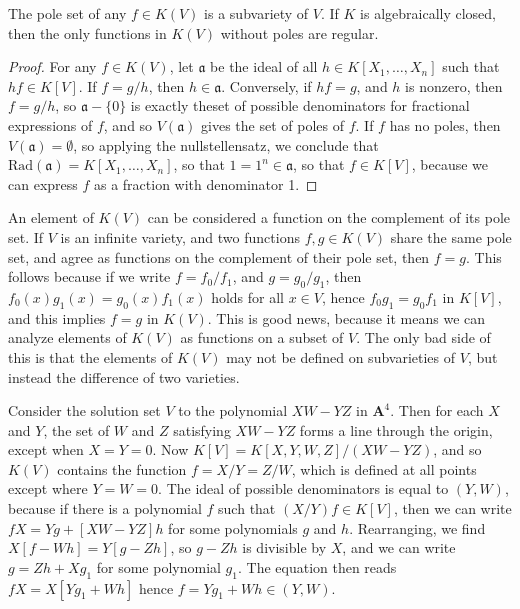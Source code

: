 \begin{prop}
    The pole set of any $f \in K(V)$ is a subvariety of $V$. If $K$ is algebraically closed, then the only functions in $K(V)$ without poles are regular.
\end{prop}
\begin{proof}
    For any $f \in K(V)$, let $\mathfrak{a}$ be the ideal of all $h \in K[X_1, \dots, X_n]$ such that $hf \in K[V]$. If $f = g/h$, then $h \in \mathfrak{a}$. Conversely, if $hf = g$, and $h$ is nonzero, then $f = g/h$, so $\mathfrak{a} - \{ 0 \}$ is exactly theset of possible denominators for fractional expressions of $f$, and so $V(\mathfrak{a})$ gives the set of poles of $f$. If $f$ has no poles, then $V(\mathfrak{a}) = \emptyset$, so applying the nullstellensatz, we conclude that $\text{Rad}(\mathfrak{a}) = K[X_1, \dots, X_n]$, so that $1 = 1^n \in \mathfrak{a}$, so that $f \in K[V]$, because we can express $f$ as a fraction with denominator 1.
\end{proof}

An element of $K(V)$ can be considered a function on the complement of its pole set. If $V$ is an infinite variety, and two functions $f,g \in K(V)$ share the same pole set, and agree as functions on the complement of their pole set, then $f = g$. This follows because if we write $f = f_0/f_1$, and $g = g_0/g_1$, then $f_0(x) g_1(x) = g_0(x) f_1(x)$ holds for all $x \in V$, hence $f_0g_1 = g_0f_1$ in $K[V]$, and this implies $f = g$ in $K(V)$. This is good news, because it means we can analyze elements of $K(V)$ as functions on a subset of $V$. The only bad side of this is that the elements of $K(V)$ may not be defined on subvarieties of $V$, but instead the difference of two varieties.

\begin{example}
    Consider the solution set $V$ to the polynomial $XW - YZ$ in $\mathbf{A}^4$. Then for each $X$ and $Y$, the set of $W$ and $Z$ satisfying $XW - YZ$ forms a line through the origin, except when $X = Y = 0$. Now $K[V] = K[X,Y,W,Z]/(XW - YZ)$, and so $K(V)$ contains the function $f = X/Y = Z/W$, which is defined at all points except where $Y = W = 0$. The ideal of possible denominators is equal to $(Y,W)$, because if there is a polynomial $f$ such that $(X/Y)f\in K[V]$, then we can write $fX = Yg + [XW - YZ]h$ for some polynomials $g$ and $h$. Rearranging, we find $X[f-Wh] = Y[g-Zh]$, so $g - Zh$ is divisible by $X$, and we can write $g = Zh + Xg_1$ for some polynomial $g_1$. The equation then reads $fX = X[Yg_1 + Wh]$ hence $f = Yg_1 + Wh \in (Y,W)$.
\end{example}

